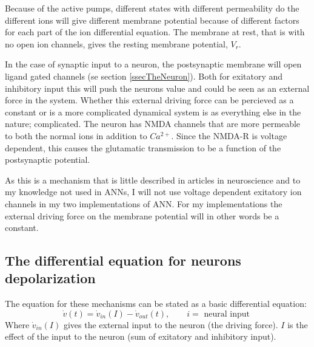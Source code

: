 Because of the active pumps, different states with different permeability do the different ions will give different membrane potential because of different factors for each part of the ion differential equation. 
The membrane at rest, that is with no open ion channels, gives the resting membrane potential, $V_r$. 

In the case of synaptic input to a neuron, the postsynaptic membrane will open ligand gated channels (se section \ref{ssecTheNeuron}). 
Both for exitatory and inhibitory input this will push the neurons value and could be seen as an external force in the system.
Whether this external driving force can be percieved as a constant or is a more complicated dynamical system is as everything else in the nature; complicated. %
The neuron has NMDA channels that are more permeable to both the normal ions in addition to $Ca^{2+}$. Since the NMDA-R is voltage dependent, this causes the glutamatic transmission to be a function of the postsynaptic potential.

As this is a mechanism that is little described in articles in neuroscience and to my knowledge not used in ANNs, I will not use voltage dependent exitatory ion channels in my two implementations of ANN. 
For my implementations the external driving force on the membrane potential will in other words be a constant.



\subsection{The differential equation for neurons depolarization}
The equation for these mechanisms can be stated as a basic differential equation:
\begin{equation}
	\dot{v}(t) = \dot{v}_{in}(I) - \dot{v}_{out}(t), \qquad i = \text{ neural input }
\end{equation}
Where $\dot{v}_{in}(I)$ gives the external input to the neuron (the driving force). %
$I$ is the effect of the input to the neuron (sum of exitatory and inhibitory input).

